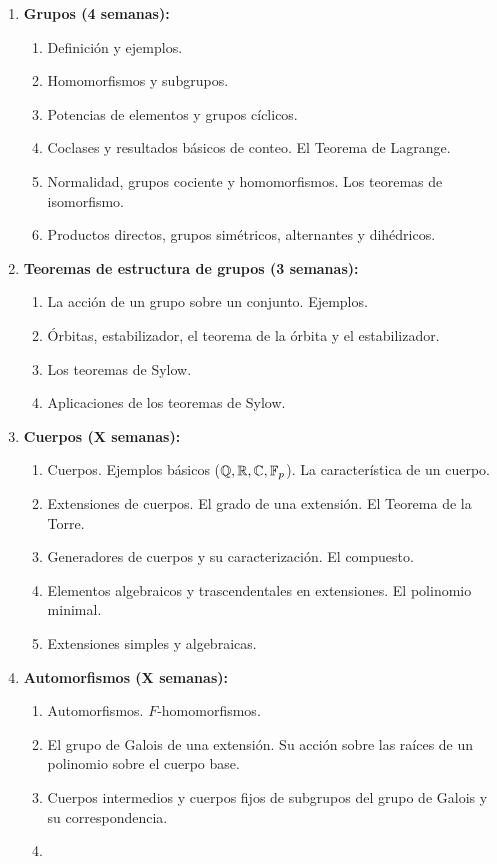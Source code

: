 \begin{refsection}
\begin{enumerate}
\item \textbf{Grupos (4 semanas):} 
\begin{enumerate}
    \item Definición y ejemplos.
    \item Homomorfismos y subgrupos.
    \item Potencias de elementos y grupos cíclicos.
    \item Coclases y resultados básicos de conteo. El Teorema de Lagrange.
    \item Normalidad, grupos cociente y homomorfismos. Los teoremas de isomorfismo.
    \item Productos directos, grupos simétricos, alternantes y dihédricos.
\end{enumerate}

\item \textbf{Teoremas de estructura de grupos (3 semanas):} 
\begin{enumerate}
    \item La acción de un grupo sobre un conjunto. Ejemplos.
    \item Órbitas, estabilizador, el teorema de la órbita y el estabilizador.
    \item Los teoremas de Sylow.
    \item Aplicaciones de los teoremas de Sylow.
\end{enumerate}

\item \textbf{Cuerpos (X semanas):} 
\begin{enumerate}
    \item Cuerpos. Ejemplos básicos ($\mathbb{Q}, \mathbb{R}, \mathbb{C}, \mathbb{F}_p$). La característica de un cuerpo.
    \item Extensiones de cuerpos. El grado de una extensión. El Teorema de la Torre.
    \item Generadores de cuerpos y su caracterización. El compuesto.
    \item Elementos algebraicos y trascendentales en extensiones. El polinomio minimal.
    \item Extensiones simples y algebraicas.
\end{enumerate}

\item \textbf{Automorfismos (X semanas):} 
\begin{enumerate}
    \item Automorfismos. $F$-homomorfismos.
    \item El grupo de Galois de una extensión. Su acción sobre las raíces de un polinomio sobre el cuerpo base.
    \item Cuerpos intermedios y cuerpos fijos de subgrupos del grupo de Galois y su correspondencia.
    \item 
\end{enumerate}



\end{enumerate}
\end{refsection}
